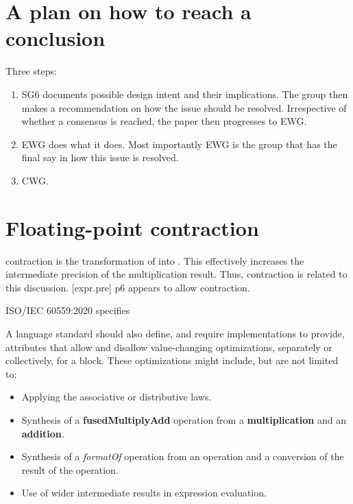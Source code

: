 \section{A plan on how to reach a conclusion}

Three steps:
\begin{enumerate}
  \item SG6 documents possible design intent and their implications.
    The group then makes a recommendation on how the issue should be resolved.
    Irrespective of whether a consensus is reached, the paper then progresses
    to EWG.

  \item EWG does what it does.
    Most importantly EWG is the group that has the final say in how this issue
    is resolved.

  \item CWG.
\end{enumerate}




\section{Floating-point contraction}

\Fp contraction is the transformation of  into
.
This effectively increases the intermediate precision of the multiplication
result.
Thus, \fp contraction is related to this discussion.
[expr.pre] p6 appears to allow \fp contraction.

ISO/IEC 60559:2020 specifies
\begin{wgText}
  A language standard should also define, and require implementations to
  provide, attributes that allow and disallow value-changing optimizations,
  separately or collectively, for a block.
  These optimizations might include, but are not limited to:
  \begin{itemize}
    \item Applying the associative or distributive laws.

    \item Synthesis of a \textbf{fusedMultiplyAdd} operation from a \textbf{multiplication} and
      an \textbf{addition}.

    \item Synthesis of a \textit{formatOf} operation from an operation and a conversion
      of the result of the operation.

    \item Use of wider intermediate results in expression evaluation.
  \end{itemize}
\end{wgText}

